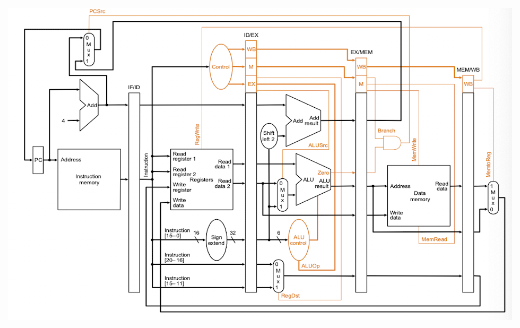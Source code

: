 \documentclass[10pt, a4paper]{article}
\begin{document}
	\includegraphics[scale=1.5]{./assets/pipelineDatapath}\\
	
\end{document}
